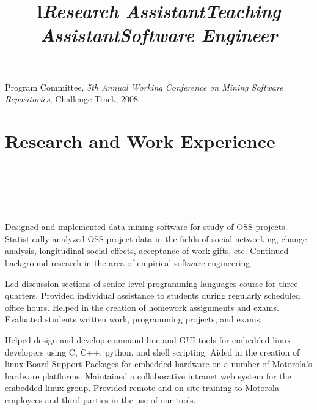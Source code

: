 \begin{resume}
Program Committee, {\em 5th Annual Working Conference on Mining Software Repositories}, 
Challenge Track, 2008

\section{\secft Research and Work Experience}

\begin{format}
\title{l}\\
\\
\\
\body\\
\end{format}

\title{\em Research Assistant}
\dash{\quad ---}
\begin{position}
Designed and implemented data mining software for study of OSS projects.
Statistically analyzed OSS project data in the fields of social networking,
change analysis, longitudinal social effects, acceptance of work gifts, etc.
Continued background research in the area of empirical software engineering
\end{position}


\title{\em Teaching Assistant}
\begin{position}
Led discussion sections of senior level programming languages course for
three quarters.
Provided individual assistance to students during regularly scheduled
office hours.  Helped in the creation of homework assignments and exams.
Evaluated students written work, programming projects,
and exams.
\end{position}



\title{\em Software Engineer}
\begin{position}
Helped design and develop command line and GUI tools for 
embedded linux developers using C,
C++, python, and shell scripting. Aided in the creation
of linux Board Support Packages for embedded hardware on
a number of Motorola's hardware platflorms.  
Maintained a collaborative intranet web system for the
embedded linux group.  Provided remote and on-site training to Motorola
employees and third parties in the use of our tools.
\end{position}


\end{resume}
